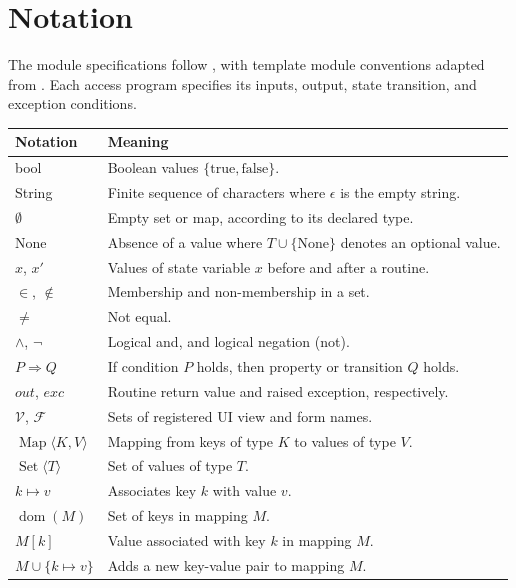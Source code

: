 \documentclass[12pt, titlepage]{article}
\begin{document}
\section{Notation}
\label{SecNotation}

The module specifications follow \citet{HoffmanAndStrooper1995}, with template
module conventions adapted from \citet{GhezziEtAl2003}. Each access program
specifies its inputs, output, state transition, and exception conditions.

\begin{table}[H]
\centering
\renewcommand{\arraystretch}{1.15}
\begin{tabularx}{\textwidth}{l X}
\toprule
\textbf{Notation} & \textbf{Meaning} \\
\midrule
bool & Boolean values $\{\text{true},\text{false}\}$. \\
String & Finite sequence of characters where $\epsilon$ is the empty string. \\
$\emptyset$ & Empty set or map, according to its declared type. \\
None & Absence of a value where $T\cup\{\text{None}\}$ denotes an optional value. \\
$x$, $x'$ & Values of state variable $x$ before and after a routine. \\
$\in$, $\notin$ & Membership and non-membership in a set. \\
$\ne$ & Not equal. \\
$\land$, $\neg$ & Logical and, and logical negation (not). \\
$P\Rightarrow Q$ & If condition $P$ holds, then property or transition $Q$ holds. \\
$out$, $exc$ & Routine return value and raised exception, respectively. \\
$\mathcal{V}$, $\mathcal{F}$ & Sets of registered UI view and form names. \\
$\operatorname{Map}\langle K,V\rangle$ & Mapping from keys of type $K$ to values of type $V$. \\
$\operatorname{Set}\langle T\rangle$ & Set of values of type $T$. \\
$k\mapsto v$ & Associates key $k$ with value $v$. \\
$\operatorname{dom}(M)$ & Set of keys in mapping $M$. \\
$M[k]$ & Value associated with key $k$ in mapping $M$. \\
$M\cup\{k\mapsto v\}$ & Adds a new key-value pair to mapping $M$. \\

\end{tabularx}
\end{table}
\end{document}
